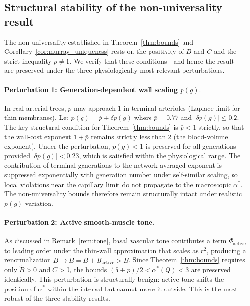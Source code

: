 \documentclass[11pt,a4paper]{article}
\theoremstyle{remark}
\begin{document}
\subsection{Structural stability of the non-universality result}
\label{sec:structural_stability}

The non-universality established in Theorem~\ref{thm:bounds} and
Corollary~\ref{cor:murray_uniqueness} rests on the positivity of $B$ and $C$ and
the strict inequality $p \neq 1$. We verify that these conditions---and hence
the result---are preserved under the three physiologically most relevant
perturbations.

\paragraph{Perturbation 1: Generation-dependent wall scaling $p(g)$.}
In real arterial trees, $p$ may approach 1 in terminal arterioles (Laplace limit
for thin membranes). Let $p(g) = \bar{p} + \delta p(g)$ where $\bar{p} = 0.77$
and $|\delta p(g)| \le 0.2$. The key structural condition for
Theorem~\ref{thm:bounds} is $\bar{p} < 1$ strictly, so that the wall-cost
exponent $1+\bar{p}$ remains strictly less than 2 (the blood-volume exponent).
Under the perturbation, $p(g) < 1$ is preserved for all generations provided
$|\delta p(g)| < 0.23$, which is satisfied within the physiological range. The
contribution of terminal generations to the network-averaged exponent is
suppressed exponentially with generation number under self-similar scaling, so
local violations near the capillary limit do not propagate to the macroscopic
$\alpha^*$. The non-universality bounds therefore remain structurally intact
under realistic $p(g)$ variation.

\paragraph{Perturbation 2: Active smooth-muscle tone.}
As discussed in Remark~\ref{rem:tone}, basal vascular tone contributes a term
$\Phi_{\mathrm{active}}$ to leading order under the thin-wall approximation that
scales as $r^2$, producing a renormalization $B \to \tilde{B} = B +
B_{\mathrm{active}} > B$. Since Theorem~\ref{thm:bounds} requires only
$\tilde{B} > 0$ and $C > 0$, the bounds $(5+p)/2 < \alpha^*(Q) < 3$ are
preserved identically. This perturbation is structurally benign: active tone
shifts the position of $\alpha^*$ within the interval but cannot move it
outside. This is the most robust of the three stability results.
\end{document}
